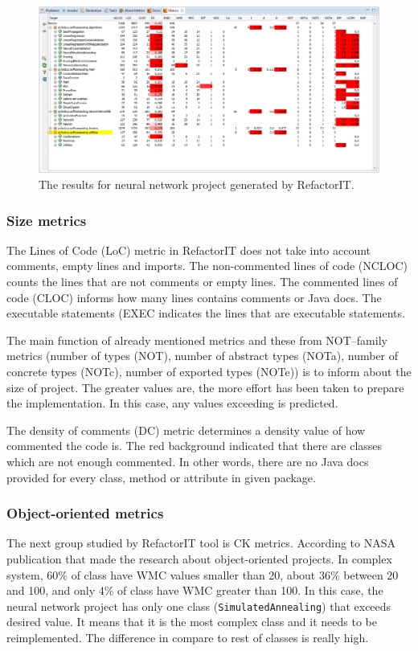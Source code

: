 \begin{figure}[h!]
	\centering
	\includegraphics[scale=0.45]{img/wyniki-refactorIT.png} 
	\caption{The results for neural network project generated by RefactorIT.}		
	\label{fig:wyniki}
\end{figure}

\subsubsection*{Size metrics}
The Lines of Code (\ac{LoC}) metric in RefactorIT does not take into account comments, empty lines and imports. The non-commented lines of code (\ac{NCLOC}) counts the lines that are not comments or empty lines. The commented lines of code (\ac{CLOC}) informs how many lines contains comments or Java docs. The executable statements (\ac{EXEC} indicates the lines that are executable statements. 

The main function of already mentioned metrics and these from NOT--family metrics (number of types (\ac{NOT}), number of abstract types (\ac{NOTa}), number of concrete types (\ac{NOTc}), number of exported types (\ac{NOTe})) is to inform about the size of project. The greater values are, the more effort has been taken to prepare the implementation. In this case, any values exceeding is predicted. 

The density of comments (\ac{DC}) metric determines a density value of how commented the code is. The red background indicated that there are classes which are not enough commented. In other words, there are no Java docs provided for every class, method or attribute in given package.

\subsubsection*{Object-oriented metrics}
The next group studied by RefactorIT tool is \ac{CK metrics}. According to NASA publication \cite{nasa} that made the research about object-oriented projects. In complex system, 60\% of class have \ac{WMC} values smaller than 20, about 36\% between 20 and 100, and only 4\% of class have \ac{WMC} greater than 100. In this case, the neural network project has only one class (\texttt{SimulatedAnnealing}) that exceeds desired value. It means that it is the most complex class and it needs to be reimplemented. The difference in compare to rest of classes is really high. 

